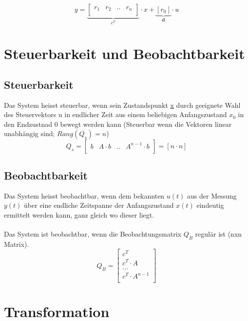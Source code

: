 \[
	y=
	\underbrace{
			\begin{bmatrix}
				r_1 & r_2 & .. & r_n\\
			\end{bmatrix}
	}_{\textbf{$c^T$}}
	\cdot x  +
	\underbrace{
		\left[ r_0 \right] 
	}_{\textbf{d}}
	\cdot u
\]
\section{Steuerbarkeit und Beobachtbarkeit}
\subsection{Steuerbarkeit}
Das System heisst steuerbar, wenn sein Zustandspunkt \underline{x} durch geeignete Wahl des Steuervektors u in endlicher Zeit aus einem beliebigen Anfangszustand $x_0$ in den Endzustnad 0 bewegt werden kann (Steuerbar wenn die Vektoren linear unabhängig sind; $Rang(Q_s) = n$)
\[
	Q_s = 
	\begin{bmatrix}
			b	&	A\cdot b	& .. & A^{n-1} \cdot b\\
	\end{bmatrix}
	= \left[ n \cdot n\right] 
\]
\subsection{Beobachtbarkeit}
Das System heisst beobachtbar, wenn dem bekannten $u(t)$ aus der Messung $y(t)$ über eine endliche Zeitspanne der Anfangszustand $x(t)$ eindeutig ermittelt werden kann, ganz gleich wo dieser liegt.\\
\\
Das System ist beobachtbar, wenn die Beobachtungsmatrix $Q_B$ regulär ist (nxn Matrix).
\[
	Q_B=
	\begin{bmatrix}
		c^T\\
		c^T \cdot A\\
		...\\
		c^T\cdot A^{n-1}\\
	\end{bmatrix}
\]
\section{Transformation}
